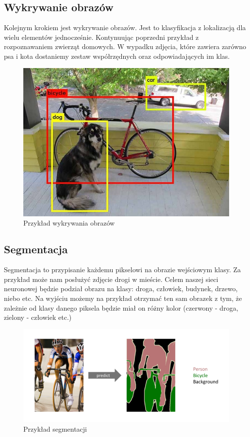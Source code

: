 \documentclass{article}
\begin{document}
\subsection{Wykrywanie obrazów}
Kolejnym krokiem jest wykrywanie obrazów. Jest to klasyfikacja z lokalizacją dla wielu elementów jednocześnie.
Kontynuując poprzedni przykład z rozpoznawaniem zwierząt domowych.
W wypadku zdjęcia, które zawiera zarówno psa i kota dostaniemy zestaw współrzędnych oraz odpowiadających im klas.
\begin{figure}[h!]
  \centering
  \includegraphics[width=\linewidth]{images/detekcja.jpeg}
  \caption{Przykład wykrywania obrazów}
  \label{fig:wykrywanie_obrazow}
\end{figure}
\subsection{Segmentacja}
Segmentacja to przypisanie każdemu pikselowi na obrazie wejściowym klasy.
Za przykład może nam posłużyć zdjęcie drogi w mieście.
Celem naszej sieci neuronowej będzie podział obrazu na klasy: droga, człowiek, budynek, drzewo, niebo etc.
Na wyjściu możemy na przykład otrzymać ten sam obrazek z tym, że zależnie od klasy danego piksela będzie miał on różny kolor (czerwony - droga, zielony - człowiek etc.)
\begin{figure}[h!]
  \centering
  \includegraphics[width=\linewidth]{images/segmentacja.png}
  \caption{Przykład segmentacji}
  \label{fig:segmentacja}
\end{figure}
\end{document}

